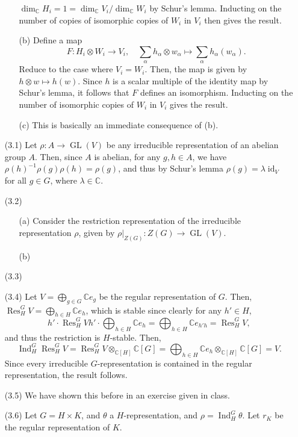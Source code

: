 \documentclass[a4paper]{report}
\theoremstyle{definition}
\theoremstyle{remark}
\theoremstyle{proposition}
\theoremstyle{conjecture}
\theoremstyle{lemma}
\theoremstyle{corollary}
\theoremstyle{exercise}
\theoremstyle{example}
\newcommand{\C}{\mathbb{C}}
\newcommand{\on}{\operatorname}
\begin{document}
\begin{enumerate}
\begin{itemize}
                $\dim_\C H_i = 1 = \dim_\C V_i/\dim_\C W_i$ by Schur's lemma.
                Inducting on the number of copies of isomorphic copies of 
                $W_i$ in $V_i$ then gives the result.
            \item[(b)]
                Define a map 
                $$F : H_i\otimes W_i \longrightarrow V_i,\quad \sum_\alpha h_\alpha \otimes w_\alpha \longmapsto \sum_\alpha h_\alpha(w_\alpha).$$
                Reduce to the case where $V_i = W_i$.
                Then, the map is given by $h\otimes w \mapsto h(w)$.
                Since $h$ is a scalar multiple of the identity map by Schur's
                lemma, it follows that $F$ defines an isomorphism.
                Inducting on the number of isomorphic copies of $W_i$ 
                in $V_i$ gives the result.
            \item[(c)] This is basically an immediate consequence of (b).
        \end{itemize}
    \item[(3.1)] Let $\rho : A \to \on{GL}(V)$ be any irreducible 
        representation of an abelian group $A$. 
        Then, since $A$ is abelian, for any $g,h\in A$, we have 
        $\rho(h)^{-1}\rho(g)\rho(h) = \rho(g)$, and thus by 
        Schur's lemma $\rho(g) = \lambda\on{id}_V$ for all $g\in G$,
        where $\lambda \in \C$.
    \item[(3.2)] 
        \begin{itemize}
            \item[(a)] Consider the restriction representation
                of the irreducible representation $\rho$, given by
                $\rho\vert_{Z(G)} : Z(G) \to \on{GL}(V)$. 
            \item[(b)]
        \end{itemize}
    \item[(3.3)]
    \item[(3.4)] Let $V = \bigoplus_{g\in G} \C e_g$ be the regular 
        representation of $G$. Then, $\on{Res}_H^GV = \bigoplus_{h\in H}\C e_h$,
        which is stable since clearly for any $h' \in H$, 
        $$h'\cdot \on{Res}_H^GV  h'\cdot \bigoplus_{h\in H}\C e_h = \bigoplus_{h\in H} \C e_{h'h} = \on{Res}_H^GV,$$ and thus the restriction is 
        $H$-stable. Then, 
        $$\on{Ind}_H^G \on{Res}_H^GV = \on{Res}_H^GV \otimes_{\C[H]} \C[G] = \bigoplus_{h\in H}\C e_h \otimes_{\C[H]}\C[G] = V.$$
        Since every irreducible $G$-representation is contained in the regular
        representation, the result follows.
    \item[(3.5)] We have shown this before in an exercise given in class.
    \item[(3.6)] Let $G = H\times K$, and $\theta$ a $H$-representation, and 
        $\rho = \on{Ind}_H^G\theta$. Let $r_K$ be the regular representation of 
        $K$.
\end{enumerate}
\end{document}
